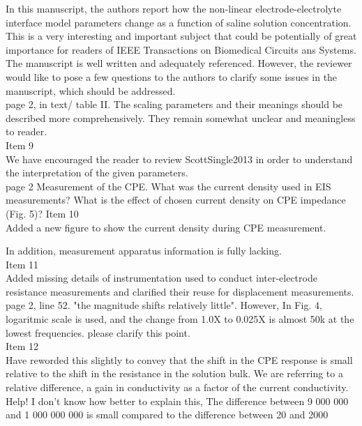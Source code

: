 \documentclass[journal, a4paper]{IEEEtran}
\begin{document}
{\color{blue}
In this manuscript, the authors report how the non-linear electrode-electrolyte interface model parameters change as a function of saline solution concentration. This is a very interesting and important subject that could be potentially of great importance for readers of IEEE Transactions on Biomedical Circuits ans Systems. The manuscript is well written and adequately referenced. However, the reviewer would like to pose a few questions to the authors to clarify some  issues in the manuscript, which should be addressed.\\

page 2, in text/ table II. The scaling parameters and their meanings should be described more comprehensively. They remain somewhat unclear and meaningless to reader.\\
{\color{OliveGreen}
    Item 9\\
    We have encouraged the reader to review ScottSingle2013 in order to understand the interpretation of the given parameters. 
}\\

page 2 Measurement of the CPE. What was the current density used in EIS measurements?
What is the effect of chosen current density on CPE impedance (Fig. 5)?
{\color{OliveGreen}
    Item 10\\
    Added a new figure to show the current density during CPE measurement.
}

In addition,  measurement apparatus information is fully lacking.\\
{\color{OliveGreen}
    Item 11\\
    Added missing details of instrumentation used to conduct inter-electrode resistance measurements and clarified their reuse for displacement measurements.
}\\

page 2, line 52. "the magnitude shifts relatively little". However, In Fig. 4, logaritmic scale is used, and the change from 1.0X to 0.025X is almost 50k at the lowest frequencies. 
please clarify this point.\\
{\color{OliveGreen}
    Item 12\\
    Have reworded this slightly to convey that the shift in the CPE response is small relative to the shift in the resistance in the solution bulk. We are referring to a relative difference, a gain in conductivity as a factor of the current conductivity.
    {\color{red} Help! I don't know how better to explain this, The difference between 9 000 000 and 1 000 000 000 is small compared to the difference between 20 and 2000}
}\\

}
\end{document}
